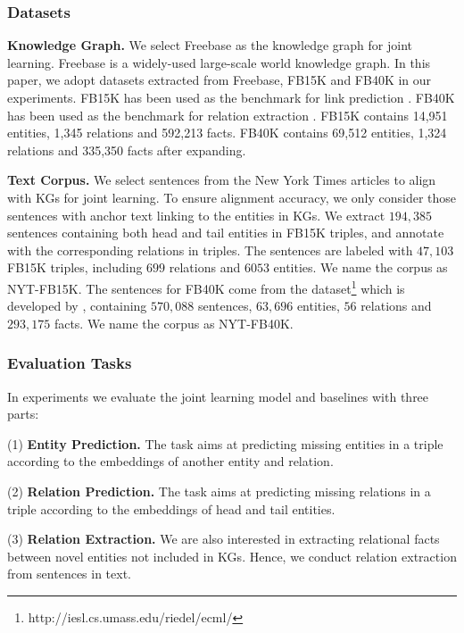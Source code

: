 \documentclass[11pt,a4paper]{article}
\begin{document}
\subsubsection{Datasets}


\textbf{Knowledge Graph.} We select Freebase \cite{bollacker2008freebase} as the knowledge graph for joint learning. Freebase is a widely-used large-scale world knowledge graph. In this paper, we adopt datasets extracted from Freebase, FB15K and FB40K in our experiments. FB15K has been used as the benchmark for link prediction \cite{bordes2013translating,wang2014transh,lin2015learning,ji2015knowledge,he2015learning,xiao2015transg,ji2016knowledge}. FB40K has been used as the benchmark for relation extraction \cite{riedel2010modeling,hoffmann2011knowledge,surdeanu2012multi,zeng2014relation,zeng2015distant,lin2016neural}. FB15K contains 14,951 entities, 1,345 relations and 592,213 facts. FB40K contains 69,512 entities, 1,324 relations and 335,350 facts after expanding.

\textbf{Text Corpus.} We select sentences from the New York Times articles to align with KGs for joint learning. To ensure alignment accuracy, we only consider those sentences with anchor text linking to the entities in KGs. We extract $194,385$ sentences containing both head and tail entities in FB15K triples, and annotate with the corresponding relations in triples. The sentences are labeled with $47,103$ FB15K triples, including $699$ relations and $6053$ entities. We name the corpus as NYT-FB15K. The sentences for FB40K come from the dataset\footnote{http://iesl.cs.umass.edu/riedel/ecml/} which is developed by \cite{riedel2010modeling}, containing $570,088$ sentences, $63,696$ entities, $56$ relations and $293,175$ facts. We name the corpus as NYT-FB40K.


\subsubsection{Evaluation Tasks}

In experiments we evaluate the joint learning model and baselines with three parts:

(1) \textbf{Entity Prediction.} The task aims at predicting missing entities in a triple according to the embeddings of another entity and relation. 

(2) \textbf{Relation Prediction.} The task aims at predicting missing relations in a triple according to the embeddings of head and tail entities. 

(3) \textbf{Relation Extraction.} We are also interested in extracting relational facts between novel entities not included in KGs. Hence, we conduct relation extraction from sentences in text.
\end{document}
